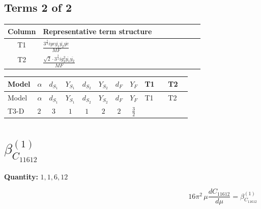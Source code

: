 \documentclass[8pt]{article}
\begin{document}
\begin{landscape}
\subsection*{Terms 2 of 2}
\begin{center}
\begin{tabular}{@{}c >{\raggedright\arraybackslash}p{0.82\linewidth}@{}}
\toprule
Column & Representative term structure \\
\midrule
T1 & \(\displaystyle \frac{3^{\frac{3}{4}} i ye \overline{y_{1}} \overline{y_{2}} \overline{ye}}{MF}\) \\
\midrule
T2 & \(\displaystyle \frac{\sqrt{2} \cdot 3^{\frac{3}{4}} i g_{2}^{2} \overline{y_{1}} \overline{y_{2}}}{MF}\) \\
\midrule
\bottomrule
\end{tabular}
\end{center}
\smallskip
\tiny
\begin{longtable}{@{}llcccccc >{\raggedright\arraybackslash}p{0.21\linewidth} >{\raggedright\arraybackslash}p{0.21\linewidth}@{}}
\toprule
Model & $\alpha$ & $d_{S_1}$ & $Y_{S_1}$ & $d_{S_2}$ & $Y_{S_2}$ & $d_F$ & $Y_F$ & T1 & T2 \\
\midrule
\endfirsthead
\toprule
Model & $\alpha$ & $d_{S_1}$ & $Y_{S_1}$ & $d_{S_2}$ & $Y_{S_2}$ & $d_F$ & $Y_F$ & T1 & T2 \\
\midrule
\endhead
T3-D & $2$ & $3$ & $1$ & $1$ & $2$ & $2$ & $\frac{3}{2}$ & \scriptsize\adjustbox{max width=\linewidth}{$\begin{gathered} - \frac{3^{\frac{3}{4}} i ye \overline{y_{1}} \overline{y_{2}} \overline{ye}}{12 MF}\end{gathered}$} & \scriptsize\adjustbox{max width=\linewidth}{$\begin{gathered} \frac{\sqrt{2} \cdot 3^{\frac{3}{4}} i g_{2}^{2} \overline{y_{1}} \overline{y_{2}}}{3 MF}\end{gathered}$} \\
\midrule
\bottomrule
\end{longtable}
\clearpage
\section*{$\beta_{C_{11612}}^{(1)}$}
\noindent\textbf{Quantity: }$\mathrm{1,1,6,12}$\par\smallskip
\[16\pi^2\,\mu\frac{d C_{11612}}{d\mu}=\beta_{C_{11612}}^{(1)}\]

\end{landscape}
\end{document}
